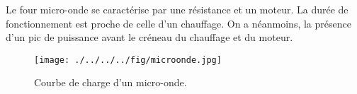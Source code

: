 \documentclass{beamer}
\begin{document}
\begin{frame}
Le four micro-onde se caractérise par une résistance et un moteur. La durée de fonctionnement est proche de celle d'un chauffage. On a néanmoins, la présence d'un pic de puissance avant le créneau du chauffage et du moteur.
\begin{figure}[!h]
\begin{center}
\texttt{[image: ./../../../fig/microonde.jpg]}
\caption{Courbe de charge d'un micro-onde.}
\label{Figure12}
\end{center}
\end{figure}
\end{frame}
\end{document}
